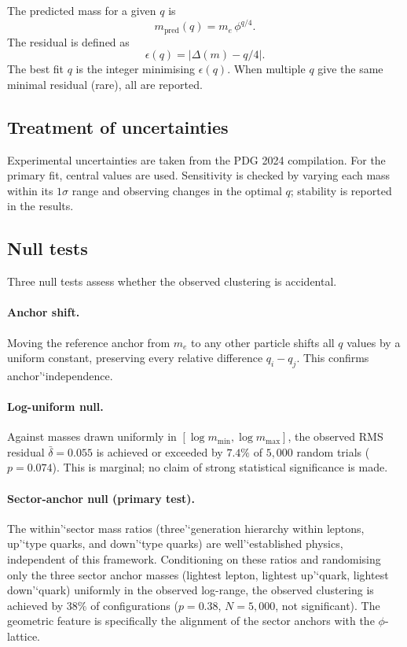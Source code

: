 \documentclass[12pt]{article}
\theoremstyle{definition}
\begin{document}
The predicted mass for a given $q$ is
\[
m_{\text{pred}}(q) = m_e \,\phi^{q/4}.
\]
The residual is defined as
\[
\epsilon(q) = \bigl|\Delta(m) - q/4\bigr|.
\]
The best fit $q$ is the integer minimising $\epsilon(q)$. When multiple $q$ give the same minimal residual (rare), all are reported.

\subsection{Treatment of uncertainties}
Experimental uncertainties are taken from the PDG 2024 compilation. For the primary fit, central values are used. Sensitivity is checked by varying each mass within its $1\sigma$ range and observing changes in the optimal $q$; stability is reported in the results.

\subsection{Null tests}
Three null tests assess whether the observed clustering is accidental.

\paragraph{Anchor shift.}
Moving the reference anchor from $m_e$ to any other particle shifts all $q$ values by a uniform constant, preserving every relative difference $q_i - q_j$. This confirms anchor'`independence.

\paragraph{Log-uniform null.}
Against masses drawn uniformly in $[\log m_{\min}, \log m_{\max}]$, the observed RMS residual $\bar\delta = 0.055$ is achieved or exceeded by $7.4\%$ of $5{,}000$ random trials ($p = 0.074$). This is marginal; no claim of strong statistical significance is made.

\paragraph{Sector-anchor null (primary test).}
The within'`sector mass ratios (three'`generation hierarchy within leptons, up'`type quarks, and down'`type quarks) are well'`established physics, independent of this framework. Conditioning on these ratios and randomising only the three sector anchor masses (lightest lepton, lightest up'`quark, lightest down'`quark) uniformly in the observed log-range, the observed clustering is achieved by $38\%$ of configurations ($p = 0.38$, $N = 5{,}000$, not significant). The geometric feature is specifically the alignment of the sector anchors with the $\phi$-lattice.
\end{document}
